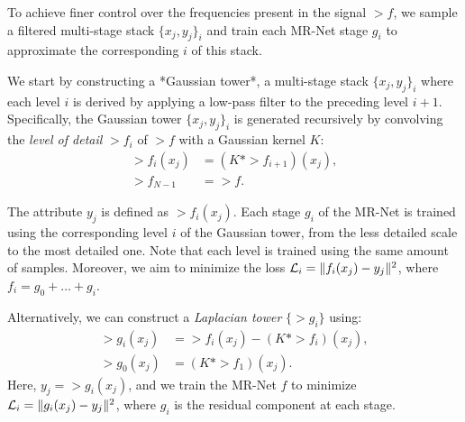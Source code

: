 To achieve finer control over the frequencies present in the signal $\gt{f}$, we sample a filtered multi-stage stack $\{x_j, y_j\}_i$ and train each MR-Net stage $g_i$ to approximate the corresponding $i$ of this stack.

We start by constructing a *Gaussian tower*, a multi-stage stack $\{x_j, y_j\}_i$ where each level $i$ is derived by applying a low-pass filter to the preceding level $i+1$. Specifically, the Gaussian tower $\{x_j, y_j\}_i$ is generated recursively by convolving the \textit{level of detail} $\gt{f}_i$ of $\gt{f}$ with a Gaussian kernel $K$:
\begin{align*}
    \gt{f}_i(x_j) &= \left(K * \gt{f}_{i+1}\right)(x_j), \\
    \gt{f}_{N-1} &= \gt{f}.
\end{align*}

The attribute $y_j$ is defined as $\gt{f}_i(x_j)$. 
Each stage $g_i$ of the MR-Net is trained using the corresponding level $i$ of the Gaussian tower, from the less detailed scale to the most detailed one. Note that each level is trained using the same amount of samples. Moreover, we aim to minimize the loss $\mathcal{L}_i = \lVert f_i(x_j)-y_j\rVert^2$, where $f_i = g_0 + \dots + g_{i}$.


Alternatively, we can construct a \textit{Laplacian tower} $\{\gt{g}_i\}$ using:
\begin{align*}
    \gt{g}_i(x_j) &= \gt{f}_i(x_j) - \left(K * \gt{f}_i\right)(x_j), \\
    \gt{g}_0(x_j) &= \left(K * \gt{f}_1\right)(x_j).
\end{align*}
Here, $y_j = \gt{g}_i(x_j)$, and we train the MR-Net $f$ to minimize $\mathcal{L}_i = \lVert g_i(x_j)-y_j\rVert^2$, where $g_i$ is the residual component at each stage.


